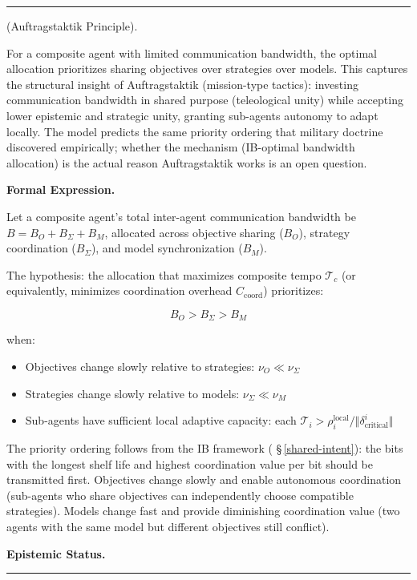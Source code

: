 \documentclass[11pt,oneside]{article}
\newcounter{claim}[section]
\renewcommand{\theclaim}{\thesection.\arabic{claim}}
\newenvironment{segment}[2]{%
  \refstepcounter{claim}%
  \bigskip\noindent\hrule\smallskip
  \noindent{\bfseries #1~\theclaim}\enskip(#2).\par\smallskip
  \noindent\ignorespaces
}{%
  \par\smallskip\noindent\hrule\bigskip
}
\newenvironment{hypothesis}[1][]{\begin{segment}{Hypothesis}{#1}}{\end{segment}}
\begin{document}
\begin{hypothesis}[Auftragstaktik Principle]
\label{auftragstaktik-principle}
For a composite agent with limited communication bandwidth, the optimal allocation prioritizes sharing objectives over strategies over models. This captures the structural insight of Auftragstaktik (mission-type tactics): investing communication bandwidth in shared purpose (teleological unity) while accepting lower epistemic and strategic unity, granting sub-agents autonomy to adapt locally. The model predicts the same priority ordering that military doctrine discovered empirically; whether the mechanism (IB-optimal bandwidth allocation) is the actual reason Auftragstaktik works is an open question.



\medskip\noindent\textbf{Formal Expression.}



Let a composite agent's total inter-agent communication bandwidth be $B = B_O + B_\Sigma + B_M$, allocated across objective sharing ($B_O$), strategy coordination ($B_\Sigma$), and model synchronization ($B_M$).

The hypothesis: the allocation that maximizes composite tempo $\mathcal{T}_c$ (or equivalently, minimizes coordination overhead $C_{\text{coord}}$) prioritizes:

$$B_O > B_\Sigma > B_M$$

when:
\begin{itemize}
  \item Objectives change slowly relative to strategies: $\nu_O \ll \nu_\Sigma$
  \item Strategies change slowly relative to models: $\nu_\Sigma \ll \nu_M$
  \item Sub-agents have sufficient local adaptive capacity: each $\mathcal{T}_i > \rho_i^{\text{local}} / \Vert\delta_{\text{critical}}^i\Vert$
\end{itemize}


The priority ordering follows from the IB framework ( \S\,\ref{shared-intent}): the bits with the longest shelf life and highest coordination value per bit should be transmitted first. Objectives change slowly and enable autonomous coordination (sub-agents who share objectives can independently choose compatible strategies). Models change fast and provide diminishing coordination value (two agents with the same model but different objectives still conflict).


\medskip\noindent\textbf{Epistemic Status.}



\end{hypothesis}
\end{document}
